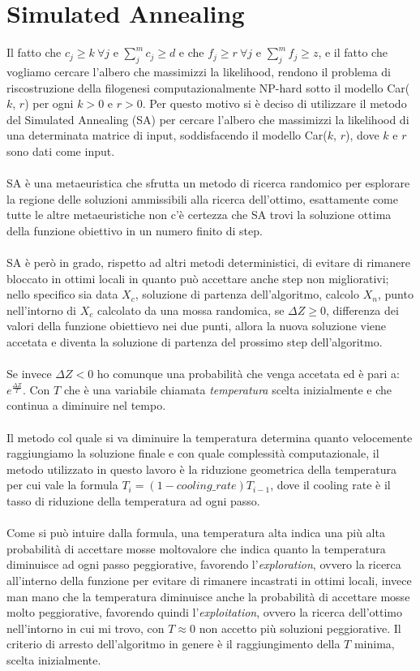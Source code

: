 \documentclass[12pt]{report}
\begin{document}
\section{Simulated Annealing}
  Il fatto che ${c}_{j}\geq k \ \forall j$ e $\sum_{j}^m {c}_{j} \geq d$ e che ${f}_{j}\geq r \ \forall j$ e $\sum_{j}^m {f}_{j} \geq z$, e il fatto che vogliamo cercare l'albero che massimizzi la likelihood, rendono il problema di riscostruzione della filogenesi computazionalmente NP-hard sotto il modello Car($k$, $r$) per ogni $k > 0$ e $r > 0$. Per questo motivo si è deciso di utilizzare il metodo del Simulated Annealing\cite{Kirkpatrick1983} (SA) per cercare l'albero che massimizzi la likelihood di una determinata matrice di input, soddisfacendo il modello Car($k$, $r$), dove $k$ e $r$ sono dati come input.\\\\
  SA è una metaeuristica che sfrutta un metodo di ricerca randomico per esplorare la regione delle soluzioni ammissibili alla ricerca dell'ottimo, esattamente come tutte le altre metaeuristiche non c'è certezza che SA trovi la soluzione ottima della funzione obiettivo in un numero finito di step.\\\\
  SA è però in grado, rispetto ad altri metodi deterministici, di evitare di rimanere bloccato in ottimi locali in quanto può accettare anche step non migliorativi; nello specifico sia data $X_{c}$, soluzione di partenza dell'algoritmo, calcolo $X_{n}$, punto nell'intorno di $X_{c}$ calcolato da una mossa randomica, se $\Delta Z\geq0$, differenza dei valori della funzione obiettievo nei due punti, allora la nuova soluzione viene accetata e diventa la soluzione di partenza del prossimo step dell'algoritmo.\\\\
  Se invece $\Delta Z < 0$ ho comunque una probabilità che venga accetata ed è pari a: $e^{\frac{\Delta Z}{T}}$.
  Con $T$ che è una variabile chiamata \emph{temperatura} scelta inizialmente e che continua a diminuire nel tempo.\\\\
  Il metodo col quale si va diminuire la temperatura determina quanto velocemente raggiungiamo la soluzione finale e con quale complessità computazionale, il metodo utilizzato in questo lavoro è la riduzione geometrica della temperatura per cui vale la formula $T_{i}=(1-cooling\_rate)T_{i-1}$, dove il cooling rate è il tasso di riduzione della temperatura ad ogni passo.\\\\
  Come si può intuire dalla formula, una temperatura alta indica una più alta probabilità di accettare mosse moltovalore che indica quanto la temperatura diminuisce ad ogni passo peggiorative, favorendo l'\emph{exploration}, ovvero la ricerca all'interno della funzione per evitare di rimanere incastrati in ottimi locali, invece man mano che la temperatura diminuisce anche la probabilità di accettare mosse molto peggiorative, favorendo quindi l'\emph{exploitation}, ovvero la ricerca dell'ottimo nell'intorno in cui mi trovo, con $T\approx 0$ non accetto più soluzioni peggiorative.
  Il criterio di arresto dell'algoritmo in genere è il raggiungimento della $T$ minima, scelta inizialmente.
\end{document}
